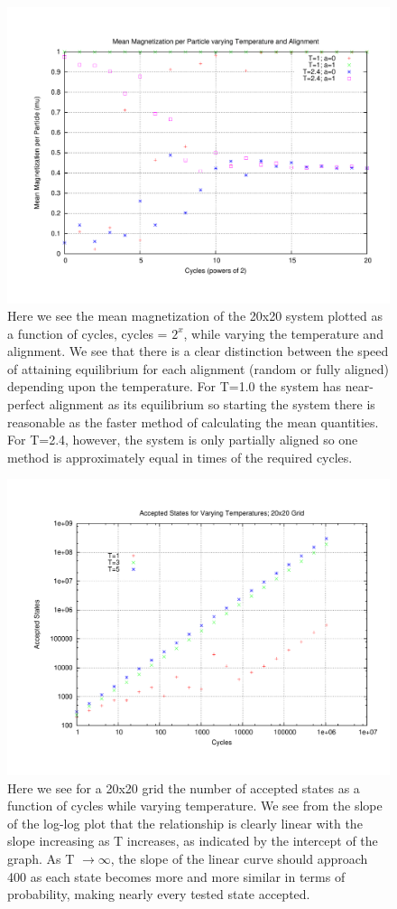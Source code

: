 \documentclass[11pt,a4paper]{article}
\begin{document}
\begin{figure}
\centering
\includegraphics[width=1.0\textwidth]{n20_meanmag.pdf}
\caption{Here we see the mean magnetization of the 20x20 system plotted as a function of cycles, cycles = $2^x$, while varying the temperature and alignment. We see that there is a clear distinction between the speed of attaining equilibrium for each alignment (random or fully aligned) depending upon the temperature. For T=1.0 the system has near-perfect alignment as its equilibrium so starting the system there is reasonable as the faster method of calculating the mean quantities. For T=2.4, however, the system is only partially aligned so one method is approximately equal in times of the required cycles.}
\end{figure}
\begin{figure}
\centering
\includegraphics[width=1.0\textwidth]{accstates_loglog.pdf}
\caption{Here we see for a 20x20 grid the number of accepted states as a function of cycles while varying temperature. We see from the slope of the log-log plot that the relationship is clearly linear with the slope increasing as T increases, as indicated by the intercept of the graph. As T $\rightarrow \infty$, the slope of the linear curve should approach 400 as each state becomes more and more similar in terms of probability, making nearly every tested state accepted.}
\end{figure}
\end{document}
